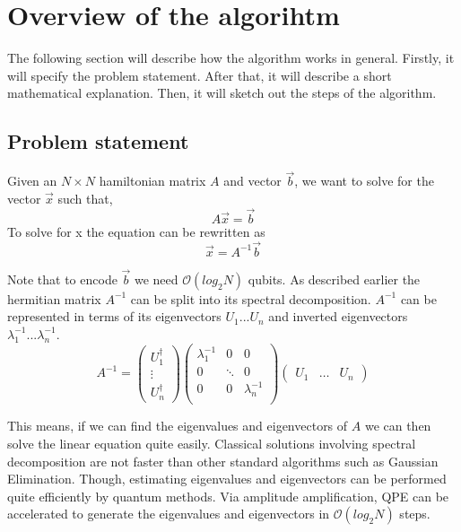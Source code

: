 \section{ Overview of the algorihtm }
The following section will describe how the algorithm works in general.
Firstly, it will specify the problem statement. 
After that, it will describe a short mathematical explanation. 
Then, it will sketch out the steps of the algorithm.

\subsection{Problem statement}

Given an $N\times N$ hamiltonian matrix $A$ and vector $\vec b$, we want to solve for the vector $\vec x$ such that,
\begin{equation}
A \vec{x} = \vec{b}
\end{equation}
To solve for x the equation can be rewritten as
\begin{equation}
\vec{x} = A^{-1}\vec{b}
\end{equation}

Note that to encode $\vec b$ we need $\mathcal{O}(log_2 N)$ qubits.
As described earlier the hermitian matrix $A^{-1}$ can be split into its spectral decomposition. 
$A^{-1}$ can be represented in terms of its eigenvectors $U_1 ... U_n$ and inverted eigenvectors $\lambda_1^{-1 } ... \lambda_n^{-1}$.
\begin{equation} 
 A^{-1} = \begin{pmatrix} U^\dagger_1 \\ \vdots \\ U^\dagger_n \end{pmatrix}
\begin{pmatrix} \lambda_1^{-1} & 0 & 0\\ 0 & \ddots & 0\\ 0 & 0& \lambda_n^{-1} \\ \end{pmatrix}
\begin{pmatrix} U_1 & \dots & U_n \end{pmatrix} 
\end{equation}

This means, if we can find the eigenvalues and eigenvectors of $A$ we can then solve the linear equation quite easily. 
Classical solutions involving spectral decomposition are not faster than other standard algorithms such as Gaussian Elimination. 
Though, estimating eigenvalues and eigenvectors can be performed quite efficiently by quantum methods.
Via amplitude amplification, QPE can be accelerated to generate the eigenvalues and eigenvectors in $\mathcal{O}(log_2 N)$ steps.

